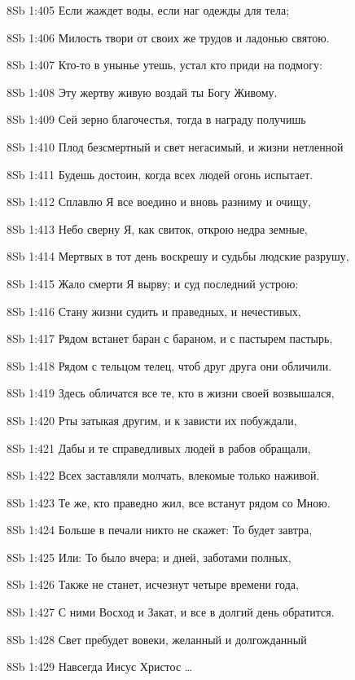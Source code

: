 \vs 8Sb 1:405 Если жаждет  воды, если наг  одежды для тела;

\vs 8Sb 1:406 Милость твори от своих же трудов и ладонью святою. 

\vs 8Sb 1:407 Кто-то в унынье  утешь, устал кто  приди на подмогу: 

\vs 8Sb 1:408 Эту жертву живую воздай ты Богу Живому. 

\vs 8Sb 1:409 Сей зерно благочестья, тогда в награду получишь

\vs 8Sb 1:410 Плод безсмертный и свет негасимый, и жизни нетленной 

\vs 8Sb 1:411 Будешь достоин, когда всех людей огонь испытает. 

\vs 8Sb 1:412 Сплавлю Я все воедино и вновь разниму и очищу, 

\vs 8Sb 1:413 Небо сверну Я, как свиток, открою недра земные, 

\vs 8Sb 1:414 Мертвых в тот день воскрешу и судьбы людские разрушу,

\vs 8Sb 1:415 Жало смерти Я вырву; и суд последний устрою: 

\vs 8Sb 1:416 Стану жизни судить и праведных, и нечестивых, 

\vs 8Sb 1:417 Рядом встанет баран с бараном, и с пастырем пастырь, 

\vs 8Sb 1:418 Рядом с тельцом телец, чтоб друг друга они обличили. 

\vs 8Sb 1:419 Здесь обличатся все те, кто в жизни своей возвышался,

\vs 8Sb 1:420 Рты затыкая другим, и к зависти их побуждали, 

\vs 8Sb 1:421 Дабы и те справедливых людей в рабов обращали, 

\vs 8Sb 1:422 Всех заставляли молчать, влекомые только наживой. 

\vs 8Sb 1:423 Те же, кто праведно жил, все встанут рядом со Мною. 

\vs 8Sb 1:424 Больше в печали никто не скажет: То будет завтра,

\vs 8Sb 1:425 Или: То было вчера; и дней, заботами полных, 

\vs 8Sb 1:426 Также не станет, исчезнут четыре времени года, 

\vs 8Sb 1:427 С ними Восход и Закат, и все в долгий день обратится. 

\vs 8Sb 1:428 Свет пребудет вовеки, желанный и долгожданный  

\vs 8Sb 1:429 Навсегда Иисус Христос \ldots

